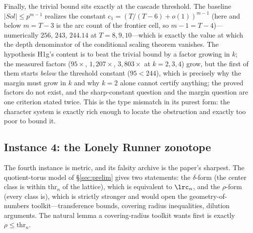 Finally, the trivial bound sits exactly at the cascade threshold. The
baseline $|Sol|\le p^{m-1}$ realizes the constant
$c_1=(T/(T-6)+o(1))^{m-1}$ (here and below $m=T-3$ is the arc count of
the frontier cell, so $m-1=T-4$)---numerically $256$, $243$, $244.14$ at
$T=8,9,10$---which is exactly the value at which the depth denominator
of the conditional scaling theorem vanishes. The hypothesis H1g's
content is to beat the trivial bound by a factor growing in $k$; the
measured factors ($95\times$, $1{,}207\times$, $3{,}803\times$ at
$k=2,3,4$) grow, but the first of them starts \emph{below} the
threshold constant ($95<244$), which is precisely why the margin must
grow in $k$ and why $k=2$ alone cannot certify anything; the proved
factors do not exist, and the sharp-constant question and the margin
question are one criterion stated twice. This is the type mismatch in its purest
form: the character system is exactly rich enough to locate the
obstruction and exactly too poor to bound it.

\subsection{Instance 4: the Lonely Runner zonotope}\label{sec:tm-zono}

The fourth instance is metric, and its falsity archive is the paper's
sharpest. The quotient-torus model of \S\ref{sec:prelim} gives two
statements: the $\delta$-form (the center class is within
$\mathrm{thr}_n$ of the lattice), which is equivalent to $\lrc_n$, and
the $\rho$-form (every class is), which is strictly stronger and would
open the geometry-of-numbers toolkit---transference bounds, covering
radius inequalities, dilution arguments. The natural lemma a
covering-radius toolkit wants first is exactly $\rho\le\mathrm{thr}_n$.

